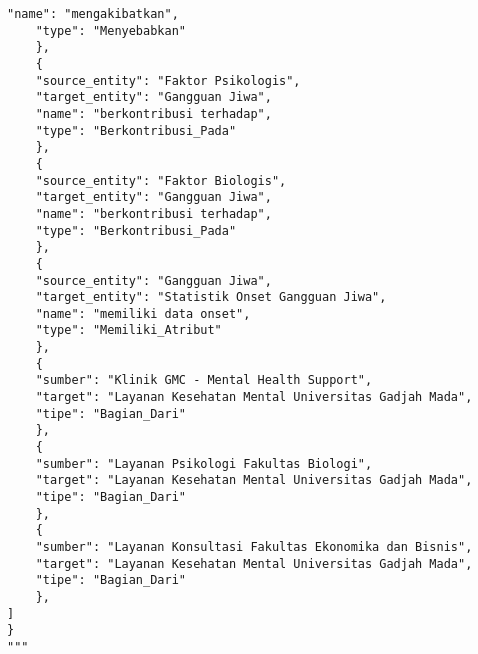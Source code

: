 \begin{lstlisting}[numbers=none]
    "name": "mengakibatkan",
    "type": "Menyebabkan"
    },
    {
    "source_entity": "Faktor Psikologis",
    "target_entity": "Gangguan Jiwa",
    "name": "berkontribusi terhadap",
    "type": "Berkontribusi_Pada"
    },
    {
    "source_entity": "Faktor Biologis",
    "target_entity": "Gangguan Jiwa",
    "name": "berkontribusi terhadap",
    "type": "Berkontribusi_Pada"
    },
    {
    "source_entity": "Gangguan Jiwa",
    "target_entity": "Statistik Onset Gangguan Jiwa",
    "name": "memiliki data onset",
    "type": "Memiliki_Atribut"
    },
    {
    "sumber": "Klinik GMC - Mental Health Support",
    "target": "Layanan Kesehatan Mental Universitas Gadjah Mada",
    "tipe": "Bagian_Dari"
    },
    {
    "sumber": "Layanan Psikologi Fakultas Biologi",
    "target": "Layanan Kesehatan Mental Universitas Gadjah Mada",
    "tipe": "Bagian_Dari"
    },
    {
    "sumber": "Layanan Konsultasi Fakultas Ekonomika dan Bisnis",
    "target": "Layanan Kesehatan Mental Universitas Gadjah Mada",
    "tipe": "Bagian_Dari"
    },
]
}
"""
\end{lstlisting}


